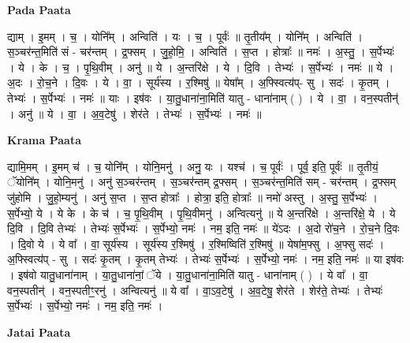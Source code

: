 \documentclass[17pt]{extarticle}
\begin{document}
\textbf{Pada Paata} \newline

द्याम् । इ॒मम् । च॒ । योनि᳚म् । अन्विति॑ । यः । च॒ । पूर्वः॑ ॥ तृ॒तीय᳚म् । योनि᳚म् । अन्विति॑ । स॒ञ्चर॑न्त॒मिति॑ सं - चर॑न्तम् । द्र॒फ्सम् । जु॒हो॒मि॒ । अन्विति॑ । स॒प्त । होत्राः᳚ ॥ नमः॑ । अ॒स्तु॒ । स॒र्पेभ्यः॑ । ये । के । च॒ । पृ॒थि॒वीम् । अनु॑ ॥ ये । अ॒न्तरि॑क्षे । ये । दि॒वि । तेभ्यः॑ । स॒र्पेभ्यः॑ । नमः॑ ॥ ये । अ॒दः । रो॒च॒ने । दि॒वः । ये । वा॒ । सूर्य॑स्य । र॒श्मिषु॑ ॥ येषा᳚म् । अ॒फ्स्वित्य॑प्- सु । सदः॑ । कृ॒तम् । तेभ्यः॑ । स॒र्पेभ्यः॑ । नमः॑ ॥ याः । इष॑वः । या॒तु॒धाना॑ना॒मिति॑ यातु - धाना॑नाम् ( ) । ये । वा॒ । वन॒स्पतीन्॑ । अनु॑ ॥ ये । वा॒ । अ॒व॒टेषु॑ । शेर॑ते । तेभ्यः॑ । स॒र्पेभ्यः॑ । नमः॑ ॥  \newline


\textbf{Krama Paata} \newline

द्यामि॒मम् । इ॒मम् च॑ । च॒ योनि᳚म् । योनि॒मनु॑ । अनु॒ यः । यश्च॑ । च॒ पूर्वः॑ । पूर्व॒ इति॒ पूर्वः॑ ॥ तृ॒तीयं॒ ॅयोनि᳚म् । योनि॒मनु॑ । अनु॑ स॒ञ्चर॑न्तम् । स॒ञ्चर॑न्तम् द्र॒फ्सम् । स॒ञ्चर॑न्त॒मिति॑ सम् - चर॑न्तम् । द्र॒फ्सम् जु॑होमि । जु॒हो॒म्यनु॑ । अनु॑ स॒प्त । स॒प्त होत्राः᳚ । होत्रा॒ इति॒ होत्राः᳚ ॥ नमो॑ अस्तु । अ॒स्तु॒ स॒र्पेभ्यः॑ । स॒र्पेभ्यो॒ ये । ये के । के च॑ । च॒ पृ॒थि॒वीम् । पृ॒थि॒वीमनु॑ । अन्वित्यनु॑ ॥ ये अ॒न्तरि॑क्षे । अ॒न्तरि॑क्षे॒ ये । ये दि॒वि । दि॒वि तेभ्यः॑ । तेभ्यः॑ स॒र्पेभ्यः॑ । स॒र्पेभ्यो॒ नमः॑ । नम॒ इति॒ नमः॑ ॥ ये॑ऽदः । अ॒दो रो॑च॒ने । रो॒च॒ने दि॒वः । दि॒वो ये । ये वा᳚ । वा॒ सूर्य॑स्य । सूर्य॑स्य र॒श्मिषु॑ । र॒श्मिष्विति॑ र॒श्मिषु॑ ॥ येषा॑म॒फ्सु । अ॒फ्सु सदः॑ । अ॒फ्स्वित्य॑प् - सु । सदः॑ कृ॒तम् । कृ॒तम् तेभ्यः॑ । तेभ्यः॑ स॒र्पेभ्यः॑ । स॒र्पेभ्यो॒ नमः॑ । नम॒ इति॒ नमः॑ ॥ या इष॑वः । इष॑वो यातु॒धाना॑नाम् । या॒तु॒धाना॑नां॒ ॅये । या॒तु॒धाना॑ना॒मिति॑ यातु - धाना॑नाम् ( ) । ये वा᳚ । वा॒ वन॒स्पतीन्॑ । वन॒स्पतीꣳ॒॒रनु॑ । अन्वित्यनु॑ ॥ ये वा᳚ । वा॒ऽव॒टेषु॑ । अ॒व॒टेषु॒ शेर॑ते । शेर॑ते॒ तेभ्यः॑ । तेभ्यः॑ स॒र्पेभ्यः॑ । स॒र्पेभ्यो॒ नमः॑ । नम॒ इति॒ नमः॑ । \newline

\textbf{Jatai Paata} \newline
\end{document}

